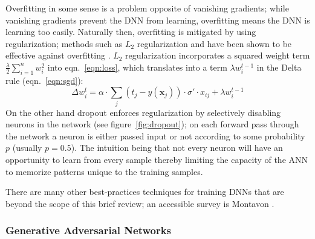 Overfitting in some sense is a problem opposite of vanishing gradients; while vanishing gradients prevent the DNN from learning, overfitting means the DNN is learning too easily.
%
Naturally then, overfitting is mitigated by using regularization; methods such as \(L_2\) regularization and  have been shown to be effective against overfitting \cite{bengio2013}.
%
\(L_2\) regularization incorporates a squared weight term \(\frac{\lambda}{2}\sum_{i=1}^n w_i^2\) into eqn.~\eqref{eqn:loss}, which translates into a  term \(\lambda w_i^{t-1}\) in the Delta rule (eqn.~\eqref{eqn:sgd}):
\begin{equation}
    \Delta w_i^t = \alpha \cdot \sum_j (t_j-y(\mathbf{x}_j))\cdot \sigma'\cdot x_{ij} + \lambda w_i^{t-1}
    \label{eqn:weightdecaydelta}
\end{equation}
On the other hand dropout enforces regularization by selectively disabling neurons in the network (see figure~\ref{fig:dropout}); on each forward pass through the network a neuron is either passed input or not according to some probability \(p\) (usually \(p = 0.5\)).
%
The intuition being that not every neuron will have an opportunity to learn from every sample thereby limiting the capacity of the ANN to memorize patterns unique to the training samples.

There are many other best-practices techniques for training DNNs that are beyond the scope of this brief review; an accessible survey is Montavon \etal \cite{montavon2012neural}.




\subsubsection{Generative Adversarial Networks}\label{subsubsec:gan}




